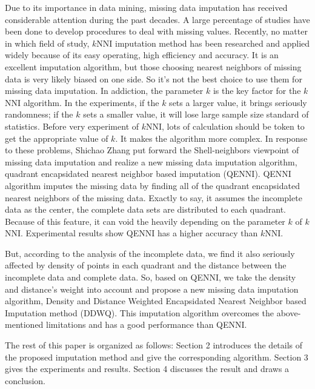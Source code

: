 \documentclass[print]{jicspack}
\begin{document}
Due to its importance in data mining, missing data imputation has received considerable attention during the past decades. A large percentage of studies\cite{Research1,Research2,Research3,Research4,Research5} have been done to develop procedures to deal with missing values. Recently, no matter in which field of study, $k$NNI\cite{KNNI2,KNNI3,KNNI4} imputation method has been researched and applied widely because of its easy operating, high efficiency and accuracy. It is an excellent imputation algorithm, but those choosing nearest neighbors of missing data is very likely biased on one side. So it's not the best choice to use them for missing data imputation. In addiction, the parameter $k$ is the key factor for the $k$NNI algorithm. In the experiments, if the $k$ sets a larger value, it brings seriously randomness; if the $k$ sets a smaller value, it will lose large sample size standard of statistics. Before very experiment of $k$NNI, lots of calculation should be token to get the appropriate value of $k$. It makes the algorithm more complex. In response to these problems, Shichao Zhang put forward the Shell-neighbors\cite{Shell} viewpoint of missing data imputation and realize a new missing data imputation algorithm, quadrant encapsidated nearest neighbor based imputation (QENNI). QENNI algorithm imputes the missing data by finding all of the quadrant encapsidated nearest neighbors of the missing data. Exactly to say, it assumes the incomplete data as the center, the complete data sets are distributed to each quadrant. Because of this feature, it can void the heavily depending on the parameter $k$ of $k$NNI. Experimental results show QENNI has a higher accuracy than $k$NNI.

But, according to the analysis of the incomplete data, we find it also seriously affected by density of points in each quadrant and the distance between the incomplete data and complete data. So, based on QENNI,  we take the density and distance's weight into account and propose a new missing data imputation algorithm, Density and Distance Weighted Encapsidated Nearest Neighbor based Imputation method (DDWQ). This imputation algorithm overcomes the above-mentioned limitations and has a good performance than QENNI.

The rest of this paper is organized as follows: Section 2 introduces the details of the proposed imputation method and give the corresponding algorithm. Section 3 gives the experiments and results. Section 4 discusses the result and draws a conclusion.
\end{document}
